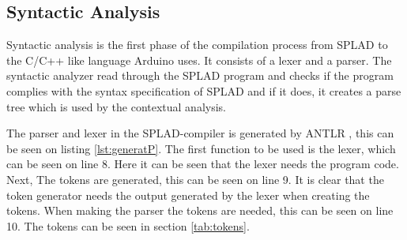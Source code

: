 \subsection{Syntactic Analysis}
Syntactic analysis is the first phase of the compilation process from SPLAD to the C/C++ like language Arduino uses. It consists of a lexer and a parser. The syntactic analyzer read through the SPLAD program and checks if the program complies with the syntax specification of SPLAD and if it does, it creates a parse tree which is used by the contextual analysis.

The parser and lexer in the SPLAD-compiler is generated by ANTLR \citep{ANTLR}, this can be seen on listing \ref{lst:generatP}. The first function to be used is the lexer, which can be seen on line 8. Here it can be seen that the lexer needs the program code. Next, The tokens are generated, this can be seen on line 9. It is clear that the token generator needs the output generated by the lexer when creating the tokens. When making the parser the tokens are needed, this can be seen on line 10. The tokens can be seen in section \ref{tab:tokens}.